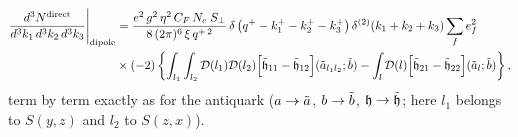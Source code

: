 \documentclass[9pt]{article}
\numberwithin{equation}{section}
\begin{document}
\begin{align}\label{eq:resq}
    \frac{d^{3}N^{\text{direct}}}{d^{3}k_{1}\,d^{3}k_{2}\, d^{3}k_{3}}\Bigg|_{\text{dipole}} & = \frac{e^{2}\,g^{2}\,\eta^{2}\,C_{F}\,N_{c}\;S_{\perp}}{8\,(2\pi)^{6}\,\xi\,q^{+\,2}}\,\delta\left(q^{+}-k^{+}_{1}-k^{+}_{2}-k^{+}_{3}\right)\delta^{(2)}(k_{1}+k_{2}+k_{3})\sum_{f}e^{2}_{f}\notag \\
    & \times(-2)\left\{\int_{l_{1}}\int_{l_{2}}\mathcal{D}(l_{1})\mathcal{D}(l_{2})\Big[\Tilde{\mathfrak{h}}_{11}-\Tilde{\mathfrak{h}}_{12}\Big](\Tilde{a}_{l_{1}l_{2}};\Tilde{b})-\int_{l}\mathcal{D}(l)\Big[\Tilde{\mathfrak{h}}_{21}-\Tilde{\mathfrak{h}}_{22}\Big](\Tilde{a}_{l};\Tilde{b})\right\},
\end{align}
term by term exactly as for the antiquark ($a\rightarrow\Tilde{a}$, $b\rightarrow\Tilde{b}$, $\mathfrak{h}\rightarrow\Tilde{\mathfrak{h}}$; here $l_{1}$ belongs to $S(y,z)$ and $l_{2}$ to $S(z,x)$).
\end{document}
